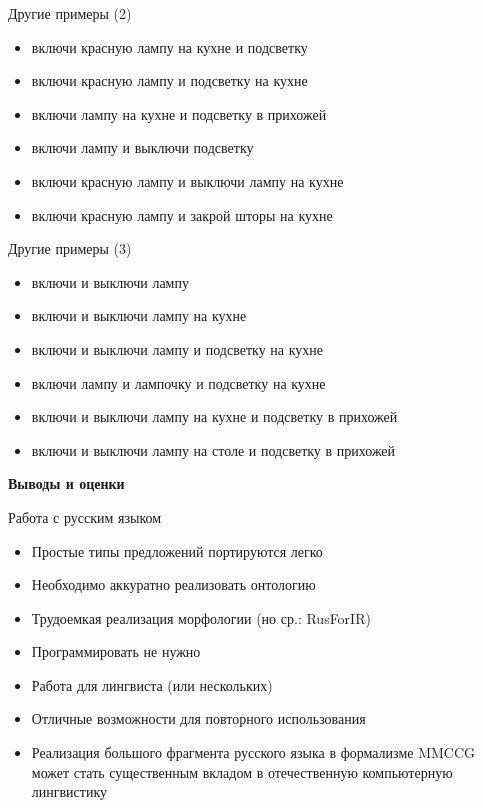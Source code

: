 \documentclass{beamer}
\begin{document}
\begin{frame}{Другие примеры (2)}
\begin{itemize}
	\item включи красную лампу на кухне и подсветку
	\item включи красную лампу и подсветку на кухне
	\item включи лампу на кухне и подсветку в прихожей
	\item включи лампу и выключи подсветку
	\item включи красную лампу и выключи лампу на кухне
	\item включи красную лампу и закрой шторы на кухне
\end{itemize}
\end{frame}

\begin{frame}{Другие примеры (3)}
\begin{itemize}
	\item включи и выключи лампу
	\item включи и выключи лампу на кухне
	\item включи и выключи лампу и подсветку на кухне
	\item включи лампу и лампочку и подсветку на кухне 
	\item включи и выключи лампу на кухне и подсветку в прихожей
	\item включи и выключи лампу на столе и подсветку в прихожей
\end{itemize}
\end{frame}


\begin{frame}{}
\begin{center}
	\textbf{Выводы и оценки}
\end{center}
\end{frame}

\begin{frame}{Работа с русским языком}
\begin{itemize}
	\item Простые типы предложений портируются легко
	\item Необходимо аккуратно реализовать онтологию
	\item Трудоемкая реализация морфологии (но ср.: RusForIR)
	\item Программировать не нужно
	\item Работа для лингвиста (или нескольких)
	\item Отличные возможности для повторного использования
	\item Реализация большого фрагмента русского языка в формализме MMCCG 
может стать существенным вкладом в отечественную компьютерную лингвистику
\end{itemize}
\end{frame}
\end{document}
